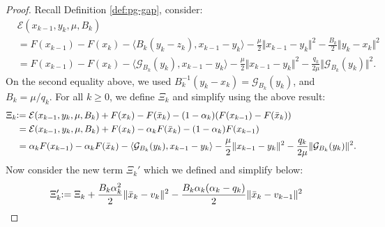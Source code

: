 \documentclass[12pt]{article}
\begin{document}
        \begin{proof}
            Recall Definition \ref{def:pg-gap}, consider: 
            \begin{align*}
                &\mathcal E(x_{k - 1}, y_k, \mu, B_k) 
                \\
                &=
                F(x_{k - 1}) - F(x_k)
                - \langle 
                    B_k(y_k - z_k), 
                    x_{k - 1} - y_k
                \rangle
                - \frac{\mu}{2}\Vert x_{k - 1} - y_k\Vert^2
                - \frac{B_k}{2}\Vert y_k - x_k\Vert^2
                \\
                &= 
                F(x_{k - 1}) - F(x_k)
                - \langle 
                    \mathcal G_{B_k}(y_k), 
                    x_{k - 1} - y_k
                \rangle
                - \frac{\mu}{2}\Vert x_{k - 1} - y_k\Vert^2
                - \frac{q_k}{2\mu}\Vert \mathcal G_{B_k}(y_k)\Vert^2. 
            \end{align*}
            On the second equality above, we used $B^{-1}_k(y_k - x_k)= \mathcal G_{B_k}(y_k)$, and $B_k = \mu/q_k$.
            For all $k \ge 0$, we define $\Xi_k$ and simplify using the above result: 
            \begin{align*}
                \Xi_k &\hspace{-0.3em}\vcentcolon= 
                \mathcal E(x_{k - 1}, y_k, \mu, B_k)
                + F(x_k) - F(\bar x_k)
                - (1 - \alpha_k)(F(x_{k - 1}) - F(\bar x_k))
                \\
                &= 
                \mathcal E(x_{k - 1}, y_k, \mu, B_k)
                + F(x_k) - \alpha_kF(\bar x_k) - (1 - \alpha_k)F(x_{k - 1})
                \\
                &=
                \alpha_kF(x_{k - 1}) - \alpha_k F(\bar x_k)
                - \langle \mathcal G_{B_k}(y_k), x_{k - 1} - y_k\rangle
                - \frac{\mu}{2}\Vert x_{k - 1} - y_k\Vert^2 
                - \frac{q_k}{2\mu}\Vert \mathcal G_{B_k}(y_k)\Vert^2. 
            \end{align*}
            Now consider the new term $\Xi_k'$ which we defined and simplify below: 
            {\allowdisplaybreaks
            \begin{align*}
                \Xi_k'
                &\hspace{-0.3em}:=
                \Xi_k + \frac{B_k\alpha_k^2}{2}\Vert \bar x_k - v_k\Vert^2 
                - \frac{B_k\alpha_k(\alpha_k - q_k)}{2}\Vert \bar x_k - v_{k - 1}\Vert^2

\end{align*}}
\end{proof}
\end{document}
